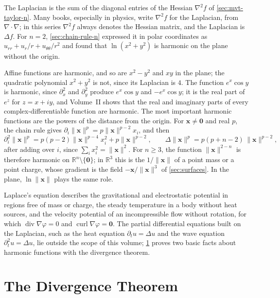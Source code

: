 The Laplacian is the sum of the diagonal entries of the Hessian $\nabla^2f$ of \cref{sec:mvt-taylor-n}. Many books, especially in physics, write $\nabla^2f$ for the Laplacian, from $\nabla\cdot\nabla$; in this series $\nabla^2f$ always denotes the Hessian matrix, and the Laplacian is $\Delta f$. For $n=2$, \cref{sec:chain-rule-n} expressed it in polar coordinates as $u_{rr}+u_r/r+u_{\theta\theta}/r^2$ and found that $\ln(x^2+y^2)$ is harmonic on the plane without the origin.

Affine functions are harmonic, and so are $x^2-y^2$ and $xy$ in the plane; the quadratic polynomial $x^2+y^2$ is not, since its Laplacian is $4$. The function $e^x\cos y$ is harmonic, since $\partial_x^2$ and $\partial_y^2$ produce $e^x\cos y$ and $-e^x\cos y$; it is the real part of $e^z$ for $z=x+iy$, and Volume~II shows that the real and imaginary parts of every complex-differentiable function are harmonic. The most important harmonic functions are the powers of the distance from the origin. For $\mathbf x\ne\mathbf0$ and real $p$, the chain rule gives $\partial_i\|\mathbf x\|^p=p\|\mathbf x\|^{p-2}x_i$, and then
\[
\partial_i^2\|\mathbf x\|^p=p(p-2)\|\mathbf x\|^{p-4}x_i^2+p\|\mathbf x\|^{p-2},\qquad\Delta\|\mathbf x\|^p=p(p+n-2)\,\|\mathbf x\|^{p-2},
\]
after adding over $i$, since $\sum_ix_i^2=\|\mathbf x\|^2$. For $n\ge3$, the function $\|\mathbf x\|^{2-n}$ is therefore harmonic on $\mathbb R^n\setminus\{\mathbf0\}$; in $\mathbb R^3$ this is the  $1/\|\mathbf x\|$ of a point mass or a point charge, whose gradient is the field $-\mathbf x/\|\mathbf x\|^3$ of \cref{sec:surfaces}. In the plane, $\ln\|\mathbf x\|$ plays the same role.

Laplace's equation describes the gravitational and electrostatic potential in regions free of mass or charge, the steady temperature in a body without heat sources, and the velocity potential of an incompressible flow without rotation, for which $\operatorname{div}\nabla\varphi=0$ and $\operatorname{curl}\nabla\varphi=\mathbf0$. The partial differential equations built on the Laplacian, such as the heat equation $\partial_tu=\Delta u$ and the wave equation $\partial_t^2u=\Delta u$, lie outside the scope of this volume; \cref{sec:divergence-theorem} proves two basic facts about harmonic functions with the divergence theorem.

\section{The Divergence Theorem}
\label{sec:divergence-theorem}

